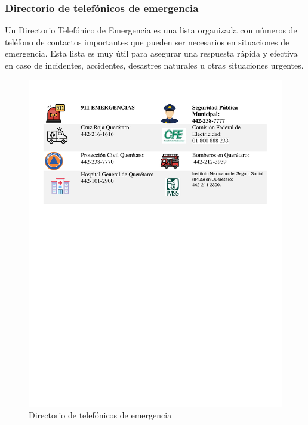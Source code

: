 \subsubsection{Directorio de telefónicos de emergencia}
Un Directorio Telefónico de Emergencia es una lista organizada con números de teléfono de contactos importantes que pueden ser necesarios en situaciones de emergencia. Esta lista es muy útil para asegurar una respuesta rápida y efectiva en caso de incidentes, accidentes, desastres naturales u otras situaciones urgentes.
%
%
\begin{figure}[H]
        \centering
        \includegraphics[trim = {15mm 160mm 10mm 3mm},clip,scale=0.43]{16/Img/numerosdeEmergencia.pdf}
        \caption{Directorio de telefónicos de emergencia}
        \label{Directorio de telefónicos de emergencia}
    \end{figure}
%
%
